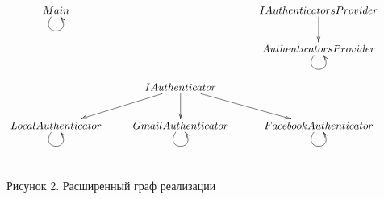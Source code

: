 \begin{center}
 $\xymatrix{
\\
Main \ar@(dl,dr)[] & & IAuthenticatorsProvider \ar@{->}[d] \\
 & & AuthenticatorsProvider \ar@(dl,dr)[]  \\
 & IAuthenticator \ar@{->}[d] \ar@{->}[dl] \ar@{->}[dr]& \\
LocalAuthenticator \ar@(dl,dr)[]  & GmailAuthenticator \ar@(dl,dr)[]  & FacebookAuthenticator \ar@(dl,dr)[] \\
& & &
 }$
\end{center}

\begin{center}
Рисунок 2. Расширенный граф реализации
\end{center}